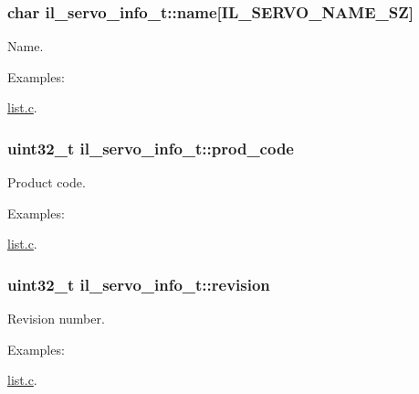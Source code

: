 \subsubsection[{\texorpdfstring{name}{name}}]{\setlength{\rightskip}{0pt plus 5cm}char il\+\_\+servo\+\_\+info\+\_\+t\+::name\mbox{[}{\bf I\+L\+\_\+\+S\+E\+R\+V\+O\+\_\+\+N\+A\+M\+E\+\_\+\+SZ}\mbox{]}}\hypertarget{structil__servo__info__t_a1499b7681107bb0310f353615f9ea6d6}{}\label{structil__servo__info__t_a1499b7681107bb0310f353615f9ea6d6}


Name. 

\begin{Desc}
\item[Examples\+: ]\par
\hyperlink{list_8c-example}{list.\+c}.\end{Desc}
\subsubsection[{\texorpdfstring{prod\+\_\+code}{prod_code}}]{\setlength{\rightskip}{0pt plus 5cm}uint32\+\_\+t il\+\_\+servo\+\_\+info\+\_\+t\+::prod\+\_\+code}\hypertarget{structil__servo__info__t_a5faaa1ff2b81386dfe159650ba85a0be}{}\label{structil__servo__info__t_a5faaa1ff2b81386dfe159650ba85a0be}


Product code. 

\begin{Desc}
\item[Examples\+: ]\par
\hyperlink{list_8c-example}{list.\+c}.\end{Desc}
\subsubsection[{\texorpdfstring{revision}{revision}}]{\setlength{\rightskip}{0pt plus 5cm}uint32\+\_\+t il\+\_\+servo\+\_\+info\+\_\+t\+::revision}\hypertarget{structil__servo__info__t_abfec53fe057b8a4a5fa79d02be777643}{}\label{structil__servo__info__t_abfec53fe057b8a4a5fa79d02be777643}


Revision number. 

\begin{Desc}
\item[Examples\+: ]\par
\hyperlink{list_8c-example}{list.\+c}.\end{Desc}
